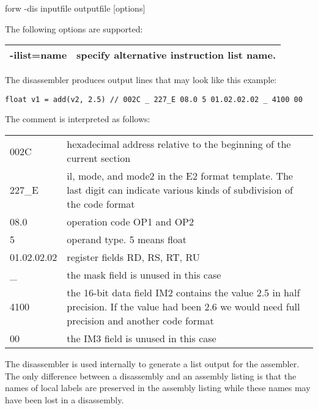 \documentclass[forwardcom.tex]{subfiles}
\begin{document}
\vspace{2mm}
\hspace{5mm} {\ttfamily forw -dis inputfile outputfile [options]}

\vspace{2mm}
The following options are supported:\\
\begin{tabular}{|p{22mm}p{140mm}|}
\hline
-ilist=name & specify alternative instruction list name.\\
\hline
\end{tabular}
\vspace{2mm}

The disassembler produces output lines that may look like this example:

\begin{lstlisting}
float v1 = add(v2, 2.5) // 002C _ 227_E 08.0 5 01.02.02.02 _ 4100 00
\end{lstlisting}
\vspace{2mm}

The comment is interpreted as follows:\\
\vspace{2mm}

\begin{tabular}{|p{22mm}p{140mm}|}
\hline
002C & hexadecimal address relative to the beginning of the current section\\
227\_E  & il, mode, and mode2 in the E2 format template. The last digit can indicate various kinds of subdivision of the code format\\
08.0 & operation code OP1 and OP2\\
5    & operand type. 5 means float\\
01.02.02.02 & register fields RD, RS, RT, RU\\
\_   & the mask field is unused in this case\\
4100 & the 16-bit data field IM2 contains the value 2.5 in half precision. If the value had been 2.6 we would need full precision and another code format\\
00 & the IM3 field is unused in this case\\
\hline
\end{tabular}
\vspace{4mm}

The disassembler is used internally to generate a list output for the assembler. The only difference between a disassembly and an assembly listing is that the names of local labels are preserved in the assembly listing while these names may have been lost in a disassembly.
\vspace{2mm}
\end{document}
